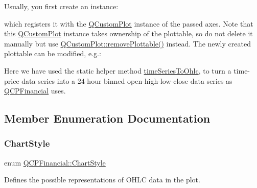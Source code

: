 Usually, you first create an instance\+:


\begin{DoxyCodeInclude}
\end{DoxyCodeInclude}
which registers it with the \hyperlink{class_q_custom_plot}{Q\+Custom\+Plot} instance of the passed axes. Note that this \hyperlink{class_q_custom_plot}{Q\+Custom\+Plot} instance takes ownership of the plottable, so do not delete it manually but use \hyperlink{class_q_custom_plot_af3dafd56884208474f311d6226513ab2}{Q\+Custom\+Plot\+::remove\+Plottable()} instead. The newly created plottable can be modified, e.\+g.\+:


\begin{DoxyCodeInclude}
\end{DoxyCodeInclude}
Here we have used the static helper method \hyperlink{class_q_c_p_financial_a9a058c035040d3939b8884f4aaccb1a7}{time\+Series\+To\+Ohlc}, to turn a time-\/price data series into a 24-\/hour binned open-\/high-\/low-\/close data series as \hyperlink{class_q_c_p_financial}{Q\+C\+P\+Financial} uses. 

\subsection{Member Enumeration Documentation}
\mbox{\label{class_q_c_p_financial_a0f800e21ee98d646dfc6f8f89d10ebfb}} 
\subsubsection{\texorpdfstring{Chart\+Style}{ChartStyle}}
{\footnotesize\ttfamily enum \hyperlink{class_q_c_p_financial_a0f800e21ee98d646dfc6f8f89d10ebfb}{Q\+C\+P\+Financial\+::\+Chart\+Style}}

Defines the possible representations of O\+H\+LC data in the plot.

